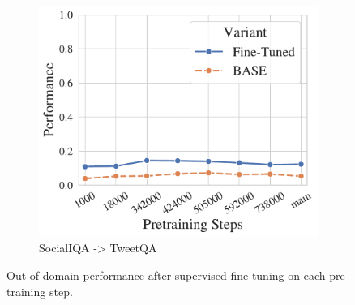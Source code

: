 \begin{figure}[t!]
\begin{subfigure}[b]{0.25\textwidth}
    \includegraphics[width=\the\columnwidth]{figures/fig_files/ood/sft_evaltweetqa-trainsocialiqa.pdf}
        \caption{SocialIQA -> TweetQA}
    \end{subfigure}%
    \caption{Out-of-domain performance after supervised fine-tuning on each pre-training step.}
    \label{fig:ood-sft-ckpt-perf}
\end{figure}